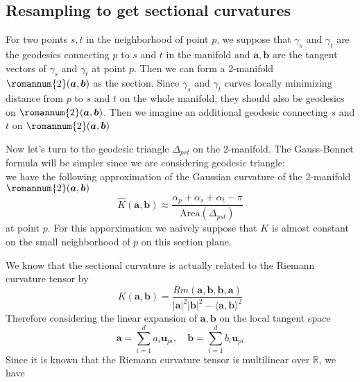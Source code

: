 \documentclass{article}
\begin{document}
\subsection{Resampling to get sectional curvatures}
 For two points $s,t$ in the neighborhood of point $p$, we suppose that 
 $\gamma_s$ and $\gamma_t$ are the geodesics connecting $p$ to $s$ and $t$ in the manifold and $\boldsymbol{a},\boldsymbol{b}$ are the tangent vectors of $\gamma_s$ and $\gamma_t$ at point $p$. Then we can form a 2-manifold $\romannum{2}(\boldsymbol{a},\boldsymbol{b})$ as the section. Since $\gamma_s$ and $\gamma_t$ curves locally minimizing distance from $p$ to $s$ and $t$ on the whole manifold, they should also be geodesics on $\romannum{2}(\boldsymbol{a},\boldsymbol{b})$. Then we imagine an additional geodesic connecting $s$ and $t$ on $\romannum{2}(\boldsymbol{a},\boldsymbol{b})$
\par
Now let's turn to the geodesic triangle $\Delta_{pst}$ on the 2-manifold. The Gauss-Bonnet formula will be simpler since we are considering geodesic triangle:
\begin{equation}
	 	
\end{equation} we have the following approximation of the Gaussian curvature of the 2-manifold $\romannum{2}(\boldsymbol{a},\boldsymbol{b})$
\begin{equation}
	\widehat{K}(\boldsymbol{a},\boldsymbol{b})\approx\frac{\alpha_p+\alpha_s+\alpha_t-\pi}{\text{Area}(\Delta_{pst})}
	\label{approxK}
\end{equation}
at point $p$. For this apporximation we naively suppose that $K$ is almost constant on the small neighborhood of $p$ on this section plane.
\par
We know that the sectional curvature is actually related to the Riemann curvature tensor by 
\begin{equation}
	K(\boldsymbol{a},\boldsymbol{b})=\frac{Rm(\boldsymbol{a},\boldsymbol{b},\boldsymbol{b},\boldsymbol{a})}{|\boldsymbol{a}|^2|\boldsymbol{b}|^2-\langle \boldsymbol{a},\boldsymbol{b}\rangle^2}
	\label{secCurve}
\end{equation}
Therefore considering the linear expansion of $\boldsymbol{a},\boldsymbol{b}$ on the local tangent space
\begin{equation}
	\boldsymbol{a}=\sum_{i=1}^da_i\boldsymbol{u}_{pi},\quad \boldsymbol{b}=\sum_{i=1}^db_i\boldsymbol{u}_{pi}
	\label{expandst}
\end{equation}
Since it is known that the Riemann curvature tensor is multilinear over $\mathbb{R}$, we have
\end{document}
